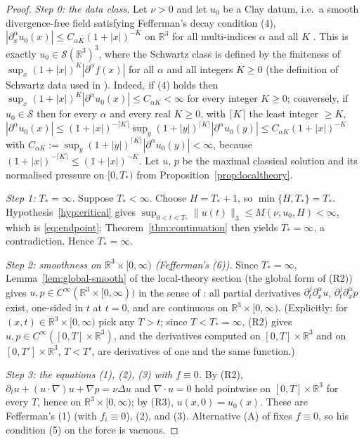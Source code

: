 \documentclass[11pt]{article}
\theoremstyle{definition}
\theoremstyle{plain}
\newcommand{\R}{\mathbb R}
\newcommand{\norm}[1]{\lVert #1\rVert}
\begin{document}
\begin{proof}
\emph{Step 0: the data class.}  Let $\nu>0$ and let $u_0$ be a Clay datum,
i.e.\ a smooth divergence-free field satisfying Fefferman's decay condition
(4), $|\partial_x^\alpha u_0(x)|\leq C_{\alpha K}(1+|x|)^{-K}$ on $\R^3$ for
all multi-indices $\alpha$ and all $K$ \cite[p.~57]{Fefferman2000}.  This is
exactly $u_0\in\mathcal S(\R^3)^3$, where the Schwartz class is defined by
the finiteness of $\sup_x(1+|x|)^K|\partial^\alpha f(x)|$ for all $\alpha$
and all integers $K\geq0$ (the definition of Schwartz data used in
\cite[Definition~1.1]{Tao2013}).  Indeed, if (4) holds then
$\sup_x(1+|x|)^K|\partial^\alpha u_0(x)|\leq C_{\alpha K}<\infty$ for every
integer $K\geq0$; conversely, if $u_0\in\mathcal S$ then for every $\alpha$
and every real $K\geq0$, with $\lceil K\rceil$ the least integer $\geq K$,
$|\partial^\alpha u_0(x)|\leq(1+|x|)^{-\lceil K\rceil}
\sup_y(1+|y|)^{\lceil K\rceil}|\partial^\alpha u_0(y)|
\leq C_{\alpha K}(1+|x|)^{-K}$ with
$C_{\alpha K}:=\sup_y(1+|y|)^{\lceil K\rceil}|\partial^\alpha u_0(y)|<\infty$,
because $(1+|x|)^{-\lceil K\rceil}\leq(1+|x|)^{-K}$.  Let $u$, $p$ be the
maximal classical solution and its normalised pressure on $[0,T_*)$ from
Proposition~\ref{prop:localtheory}.

\emph{Step 1: $T_*=\infty$.}  Suppose $T_*<\infty$.  Choose $H=T_*+1$, so
$\min\{H,T_*\}=T_*$.  Hypothesis~\ref{hyp:critical} gives
$\sup_{0<t<T_*}\norm{u(t)}_3\leq M(\nu,u_0,H)<\infty$, which is
\eqref{eq:endpoint}; Theorem~\ref{thm:continuation} then yields $T_*=\infty$,
a contradiction.  Hence $T_*=\infty$.

\emph{Step 2: smoothness on $\R^3\times[0,\infty)$ (Fefferman's (6)).}  Since
$T_*=\infty$, Lemma~\ref{lem:global-smooth} of the local-theory section (the
global form of (R2)) gives $u,p\in C^\infty(\R^3\times[0,\infty))$ in the
sense of \cite[p.~58, (6)]{Fefferman2000}: all partial derivatives
$\partial_t^j\partial_x^\alpha u$, $\partial_t^j\partial_x^\alpha p$ exist,
one-sided in $t$ at $t=0$, and are continuous on $\R^3\times[0,\infty)$.
(Explicitly: for $(x,t)\in\R^3\times[0,\infty)$ pick any $T>t$; since
$T<T_*=\infty$, (R2) gives $u,p\in C^\infty([0,T]\times\R^3)$, and the
derivatives computed on $[0,T]\times\R^3$ and on $[0,T']\times\R^3$, $T<T'$,
are derivatives of one and the same function.)

\emph{Step 3: the equations (1), (2), (3) with $f\equiv0$.}  By (R2),
$\partial_tu+(u\cdot\nabla)u+\nabla p=\nu\Delta u$ and $\nabla\cdot u=0$ hold
pointwise on $[0,T]\times\R^3$ for every $T$, hence on $\R^3\times[0,\infty)$;
by (R3), $u(x,0)=u_0(x)$.  These are Fefferman's (1) (with $f_i\equiv0$), (2),
and (3).  Alternative (A) of \cite[p.~58]{Fefferman2000} fixes $f\equiv0$,
so his condition (5) on the force is vacuous.


\end{proof}
\end{document}
